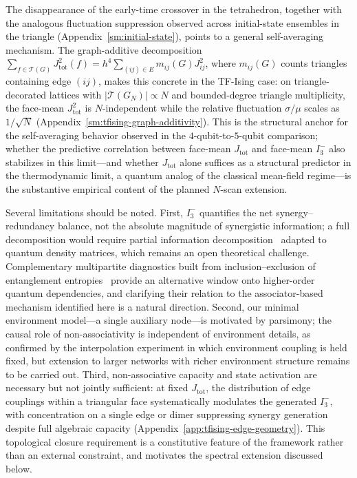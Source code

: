 \documentclass[aps,physrev,preprint,groupedaddress]{revtex4-2}
\begin{document}
The disappearance of the early-time crossover in the tetrahedron, together with the analogous fluctuation suppression observed across initial-state ensembles in the triangle (Appendix~\ref{sm:initial-state}), points to a general self-averaging mechanism. The graph-additive decomposition $\sum_{f \in \mathcal{T}(G)} J_{\mathrm{tot}}^2(f) = h^4 \sum_{(ij) \in E} m_{ij}(G) J_{ij}^2$, where $m_{ij}(G)$ counts triangles containing edge $(ij)$, makes this concrete in the TF-Ising case: on triangle-decorated lattices with $\lvert\mathcal{T}(G_N)\rvert \propto N$ and bounded-degree triangle multiplicity, the face-mean $J_{\mathrm{tot}}^2$ is $N$-independent while the relative fluctuation $\sigma/\mu$ scales as $1/\sqrt{N}$ (Appendix~\ref{sm:tfising-graph-additivity}). This is the structural anchor for the self-averaging behavior observed in the $4$-qubit-to-$5$-qubit comparison; whether the predictive correlation between face-mean $J_{\mathrm{tot}}$ and face-mean $I_3^-$ also stabilizes in this limit—and whether $J_{\mathrm{tot}}$ alone suffices as a structural predictor in the thermodynamic limit, a quantum analog of the classical mean-field regime—is the substantive empirical content of the planned $N$-scan extension.

Several limitations should be noted. First, $I_3^-$ quantifies the net synergy–redundancy balance, not the absolute magnitude of synergistic information; a full decomposition would require partial information decomposition~\cite{rosas2019Oinfo, scagliarini2023GradientsOinformation} adapted to quantum density matrices, which remains an open theoretical challenge. Complementary multipartite diagnostics built from inclusion–exclusion of entanglement entropies~\cite{santalla2026HyperlinkRepresentation}  provide an alternative window onto higher-order quantum dependencies, and clarifying their relation to the associator-based mechanism identified here is a natural direction. Second, our minimal environment model—a single auxiliary node—is motivated by parsimony; the causal role of non-associativity is independent of environment details, as confirmed by the interpolation experiment in which environment coupling is held fixed, but extension to larger networks with richer environment structure remains to be carried out. Third, non-associative capacity and state activation are necessary but not jointly sufficient: at fixed $J_{\mathrm{tot}}$, the distribution of edge couplings within a triangular face systematically modulates the generated $I_3^-$, with concentration on a single edge or dimer suppressing synergy generation despite full algebraic capacity (Appendix~\ref{app:tfising-edge-geometry}). This topological closure requirement is a constitutive feature of the framework rather than an external constraint, and motivates the spectral extension discussed below.
\end{document}
